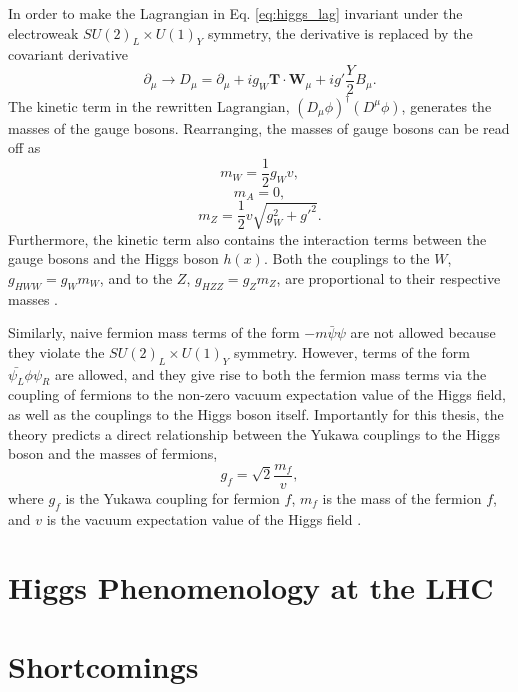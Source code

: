 In order to make the Lagrangian in Eq. \ref{eq:higgs_lag} invariant under the electroweak
$SU(2)_L \times U(1)_Y$ symmetry, the derivative is replaced by the covariant
derivative \cite{Thomson:2013zua}
\begin{equation}
\partial_\mu \rightarrow D_\mu = \partial_\mu + i g_W \mathbf{T} \cdot \mathbf{W}_\mu
+ i g' \frac{Y}{2} B_\mu.
\end{equation}
The kinetic term in the rewritten Lagrangian, $(D_\mu \phi)^\dag (D^\mu \phi)$, generates the
masses of the gauge bosons. Rearranging, the masses of gauge bosons can be read off as
\begin{equation}
m_W = \frac{1}{2} g_W v,
\end{equation}
\begin{equation}
m_A = 0,
\end{equation}
\begin{equation}
m_Z = \frac{1}{2}v\sqrt{g_W^2 + g'^2}.
\end{equation}
Furthermore, the kinetic term also contains the interaction terms between the gauge bosons
and the Higgs boson $h(x)$. Both the couplings to the $W$, $g_{HWW}=g_W m_W$, and to the $Z$,
$g_{HZZ} = g_Z m_Z$, are proportional to their respective masses \cite{Thomson:2013zua}.

Similarly, naive fermion mass terms of the form $-m \bar{\psi}\psi$ are not allowed because
they violate the $SU(2)_L \times U(1)_Y$ symmetry. However, terms of the form
$\bar{\psi_L}\phi\psi_R$ are allowed, and they give rise to both the fermion mass terms
via the coupling of fermions to the non-zero vacuum expectation value of the Higgs field,
as well as the couplings to the Higgs boson itself. Importantly for this thesis, the theory
predicts a direct relationship between the Yukawa couplings to the Higgs boson and the
masses of fermions,
\begin{equation}
g_f = \sqrt{2}\frac{m_f}{v},
\end{equation}
where $g_f$ is the Yukawa coupling for fermion $f$, $m_f$ is the mass of the fermion $f$,
and $v$ is the vacuum expectation value of the Higgs field \cite{Thomson:2013zua}.

\section{Higgs Phenomenology at the LHC}


\section{Shortcomings}

